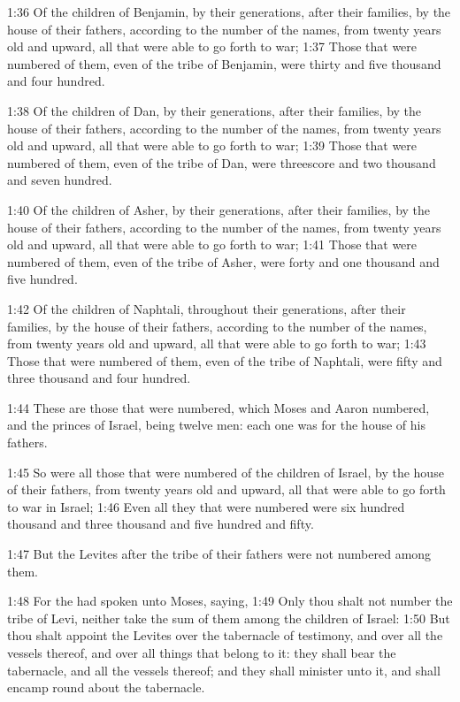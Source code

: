 1:36 Of the children of Benjamin, by their generations, after their
families, by the house of their fathers, according to the number of
the names, from twenty years old and upward, all that were able to go
forth to war; 1:37 Those that were numbered of them, even of the tribe
of Benjamin, were thirty and five thousand and four hundred.

1:38 Of the children of Dan, by their generations, after their
families, by the house of their fathers, according to the number of
the names, from twenty years old and upward, all that were able to go
forth to war; 1:39 Those that were numbered of them, even of the tribe
of Dan, were threescore and two thousand and seven hundred.

1:40 Of the children of Asher, by their generations, after their
families, by the house of their fathers, according to the number of
the names, from twenty years old and upward, all that were able to go
forth to war; 1:41 Those that were numbered of them, even of the tribe
of Asher, were forty and one thousand and five hundred.

1:42 Of the children of Naphtali, throughout their generations, after
their families, by the house of their fathers, according to the number
of the names, from twenty years old and upward, all that were able to
go forth to war; 1:43 Those that were numbered of them, even of the
tribe of Naphtali, were fifty and three thousand and four hundred.

1:44 These are those that were numbered, which Moses and Aaron
numbered, and the princes of Israel, being twelve men: each one was
for the house of his fathers.

1:45 So were all those that were numbered of the children of Israel,
by the house of their fathers, from twenty years old and upward, all
that were able to go forth to war in Israel; 1:46 Even all they that
were numbered were six hundred thousand and three thousand and five
hundred and fifty.

1:47 But the Levites after the tribe of their fathers were not
numbered among them.

1:48 For the \LORD had spoken unto Moses, saying, 1:49 Only thou shalt
not number the tribe of Levi, neither take the sum of them among the
children of Israel: 1:50 But thou shalt appoint the Levites over the
tabernacle of testimony, and over all the vessels thereof, and over
all things that belong to it: they shall bear the tabernacle, and all
the vessels thereof; and they shall minister unto it, and shall encamp
round about the tabernacle.

